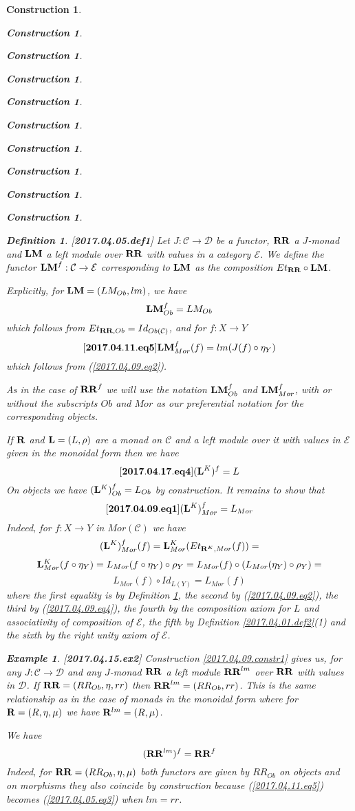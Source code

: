 \documentclass[12pt]{amsart}
\newenvironment{eq}{\begin{equation}}{\end{equation}}
\newtheorem{definition}[proposition]{Definition}
\newtheorem{example}[proposition]{Example}
\newtheorem{construction}[proposition]{Construction}
\newcommand{\llabel}[1]{\label{#1}[{\bf #1}]}
\newcommand{\sr}{\rightarrow}
\newcommand{\R}{{\bf R}}
\newcommand{\RR}{{\bf RR}}
\newcommand{\LM}{{\bf LM}}
\newcommand{\C}{{\mathcal C}}
\newcommand{\D}{{\mathcal D}}
\newcommand{\E}{{\mathcal E}}
\begin{document}
\begin{construction}
\begin{construction}
\begin{construction}
\begin{construction}
\begin{construction}
\begin{construction}
\begin{construction}
\begin{construction}
\begin{construction}
\begin{construction}
%
\begin{definition}
\llabel{2017.04.05.def1}
Let $J:\C\sr\D$ be a functor, $\RR$ a $J$-monad and $\LM$ a left module over $\RR$ with values in a category $\E$. We define the functor $\LM^f:\C\sr \E$ corresponding to $\LM$ as the composition $Et_{\RR}\circ \LM$.
\end{definition}
%
Explicitly, for $\LM=(LM_{Ob},lm)$, we have
%
$$\LM^f_{Ob}=LM_{Ob}$$
%
which follows from $Et_{\RR,Ob}=Id_{Ob(\C)}$, and for $f:X\sr Y$ 
%
\begin{eq}\llabel{2017.04.11.eq5}
\LM^f_{Mor}(f)=lm(J(f)\circ \eta_{Y})
\end{eq}
%
which follows from (\ref{2017.04.09.eq2}). 

As in the case of $\RR^f$ we will use the notation $\LM^f_{Ob}$ and $\LM^f_{Mor}$, with or without the subscripts $Ob$ and $Mor$ as our preferential notation for the corresponding objects.

If $\R$ and ${\bf L}=(L,\rho)$ are a monad on $\C$ and a left module over it with values in $\E$ given in the monoidal form then we have 
%
\begin{eq}
\llabel{2017.04.17.eq4}
({\bf L}^K)^f=L
\end{eq}
%
On objects we have $({\bf L}^K)^f_{Ob}=L_{Ob}$ by construction. It remains to show that 
%
\begin{eq}\llabel{2017.04.09.eq1}
({\bf L}^K)^f_{Mor}=L_{Mor}
\end{eq}
%
Indeed, for $f:X\sr Y$ in $Mor(\C)$ we have
%
$$({\bf L}^K)^f_{Mor}(f)={\bf L}^K_{Mor}(Et_{\R^K,Mor}(f))=
$$$${\bf L}^K_{Mor}(f\circ \eta_Y)=L_{Mor}(f\circ \eta_Y)\circ \rho_Y=L_{Mor}(f)\circ (L_{Mor}(\eta_Y)\circ \rho_Y)=
$$$$L_{Mor}(f)\circ Id_{L(Y)}=L_{Mor}(f)$$
%
where the first equality is by Definition \ref{2017.04.05.def1}, the second by (\ref{2017.04.09.eq2}), the third by (\ref{2017.04.09.eq4}), the fourth by the composition axiom for $L$ and associativity of composition of $\E$, the fifth by Definition \ref{2017.04.01.def2}(1) and the sixth by the right unity axiom of $\E$. 
%
\begin{example}\rm
\llabel{2017.04.15.ex2}
Construction \ref{2017.04.09.constr1} gives us, for any $J:\C\sr \D$ and any $J$-monad $\RR$ a left module $\RR^{lm}$ over $\RR$ with values in $\D$. 
If $\RR=(RR_{Ob},\eta,rr)$ then $\RR^{lm}=(RR_{Ob},rr)$. This is the same relationship as in the case of monads in the monoidal form where for $\R=(R,\eta,\mu)$ we have $\R^{lm}=(R,\mu)$. 

We have 
%
$$(\RR^{lm})^f=\RR^f$$
%
Indeed, for $\RR=(RR_{Ob},\eta,\mu)$ both functors are given by $RR_{Ob}$ on objects and on morphisms they also coincide by construction because (\ref{2017.04.11.eq5}) becomes (\ref{2017.04.05.eq3}) when $lm=rr$. 


\end{example}
\end{construction}
\end{construction}
\end{construction}
\end{construction}
\end{construction}
\end{construction}
\end{construction}
\end{construction}
\end{construction}
\end{construction}
\end{document}
